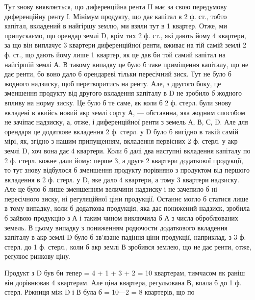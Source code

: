 Тут знову виявляється, що диференційна рента II має за свою передумову
диференційну ренту І. Мінімум продукту, що дає капітал в 2  ф. ст., тобто капітал,
вкладений в найгіршу землю, ми взяли тут в 1 квартер. Отже, ми припускаємо,
що орендар землі D, крім тих 2  ф. ст., які дають йому 4 квартери,
за що він виплачує 3 квартери диференційної ренти, вживає на тій самій землі
2  ф. ст., що дають йому лише 1 квартер, як це дав би той самий капітал на
найгіршій землі А. В такому випадку це було б таке приміщення капіталу,
що не дає ренти, бо воно дало б орендареві тільки пересічний зиск. Тут не
було б жодного надзиску, щоб перетворитись на ренту. Але, з другого боку, це
зменшення продукту від другого вкладення капіталу в D не зробило б жодного
впливу на норму зиску. Це було б те саме, як коли б 2  ф. стерл. були знову
вкладені в якийсь новий акр землі сорту А, — обставина, яка жодним способом
не зачіпає надзиску, а, отже, і диференційної ренти з земель А, В, С, D.
Але для орендаря це додаткове вкладення 2  ф. стерл. у D було б вигідно
в такій самій мірі, як, згідно з нашим припущенням, вкладення первісних
2  ф. стерл. у акр землі D, хоч вона дає 4 квартери. Коли б далі два наступні
вкладення капіталу по 2  ф. стерл. кожне дали йому: перше 3, а друге
2 квартери додаткової продукції, то тут знову відбулося б зменшення продукту
порівняно з продуктом від першого вкладення в 2  ф. стерл. у D, яке
дало 4 квартери, а тому 3 квартери надзиску. Але це було б лише зменшенням
величини надзиску і не зачепило б ні пересічного зиску, ні регуляційної ціни
продукції. Останнє могло б статися лише в тому випадку, коли б додаткова
продукція, яка дає понижений надзиск, зробила б зайвою продукцію з А і таким
чином виключила б А з числа оброблюваних земель. В цьому випадку
з пониженням родючости додаткового вкладення капіталу в акр землі D було б
зв’язане падіння ціни продукції, наприклад, з 3 ф. стерл. до 1  ф. стерл.,
коли б акр землі В зробився землею, що не дає ренти, отже, реґулює ринкову ціну.

Продукт з D був би тепер = 4 + 1 + 3 + 2 = 10 квартерам, тимчасом
як раніш він дорівнював 4 квартерам. Але ціна квартера, регульована В, впала б
до 1  ф. стерл. Ріжниця між D і В була б = 10—2 = 8 квартерів, що по
\parbreak{}  %
